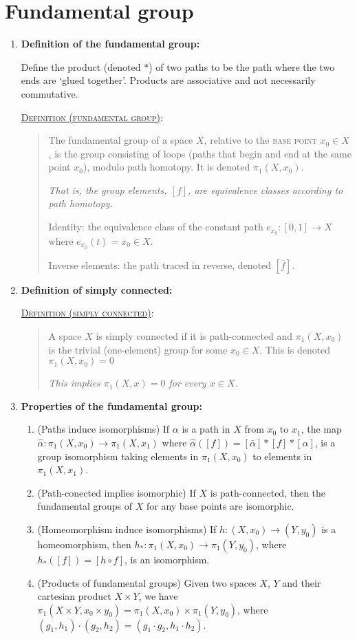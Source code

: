 \documentclass[letterpaper, 12pt]{book}
\newcommand{\defn}[2]{\textsc{\underline{Definition (#1)}:}\begin{quote} #2\end{quote}}
\begin{document}
\section{Fundamental group}
    \begin{enumerate}[resume]
    \item \textbf{Definition of the fundamental group:}

        Define the product (denoted $*$) of two paths to be the path where the two ends are `glued together'. Products are associative and not necessarily commutative.

        \defn{fundamental group}{The fundamental group of a space $X$, relative to the \textsc{base point} $x_0\in X$, is the group consisting of loops (paths that begin and end at the same point $x_0$), modulo path homotopy. It is denoted $\pi_1(X, x_0)$.

        \textit{That is, the group elements, $[f]$, are equivalence classes according to path homotopy.}

        Identity: the equivalence class of the constant path $e_{x_0} : [0,1]\to X$ where $e_{x_0}(t) = x_0 \in X$.

        Inverse elements: the path traced in reverse, denoted $[\bar f]$.}
    \item \textbf{Definition of simply connected:}

        \defn{simply connected}{A space $X$ is simply connected if it is path-connected and $\pi_1(X,x_0)$ is the trivial (one-element) group for some $x_0\in X$. This is denoted $\pi_1(X,x_0) = 0$

        \textit{This implies $\pi_1(X,x)=0$ for every $x\in X$.}}
    \item \textbf{Properties of the fundamental group:}
        \begin{enumerate}
        \item (Paths induce isomorphisms) If $\alpha$ is a path in $X$ from $x_0$ to $x_1$, the map $\hat\alpha : \pi_1(X,x_0)\to \pi_1(X,x_1)$ where $\hat\alpha([f]) = [\bar\alpha]*[f]*[\alpha]$, is a group isomorphism taking elements in $\pi_1(X,x_0)$ to elements in $\pi_1(X,x_1)$.
        \item (Path-conected implies isomorphic) If $X$ is path-connected, then the fundamental groups of $X$ for any base points are isomorphic.
        \item (Homeomorphism induce isomorphisms) If $h:(X,x_0) \to (Y,y_0)$ is a homeomorphism, then $h_* : \pi_1(X,x_0)\to\pi_1(Y,y_0)$, where $h_*([f]) = [h\circ f]$, is an isomorphism.
        \item (Products of fundamental groups) Given two spaces $X$, $Y$ and their cartesian product $X\times Y$, we have $\pi_1(X\times Y, x_0\times y_0) = \pi_1(X,x_0) \times \pi_1(Y,y_0)$, where $(g_1,h_1)\cdot(g_2,h_2) = (g_1\cdot g_2, h_1\cdot h_2)$.
        \end{enumerate}
    \end{enumerate}
\end{document}
